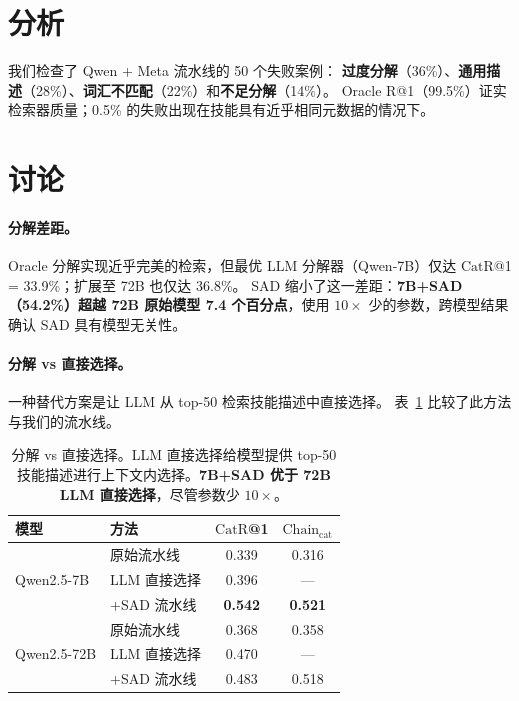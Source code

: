 \documentclass[11pt,a4paper]{ctexart}
\newcommand{\catrecall}{\text{CatR}}
\newcommand{\chaincat}{\text{Chain}_\text{cat}}
\begin{document}
\section{分析}
\label{sec:analysis}

我们检查了 Qwen + Meta 流水线的 50 个失败案例：
\textbf{过度分解}（36\%）、\textbf{通用描述}（28\%）、\textbf{词汇不匹配}（22\%）和\textbf{不足分解}（14\%）。
Oracle R@1（99.5\%）证实检索器质量；0.5\% 的失败出现在技能具有近乎相同元数据的情况下。

\section{讨论}
\label{sec:discussion}

\paragraph{分解差距。}
Oracle 分解实现近乎完美的检索，但最优 LLM 分解器（Qwen-7B）仅达 $\catrecall$@1 = 33.9\%；扩展至 72B 也仅达 36.8\%。
SAD 缩小了这一差距：\textbf{7B+SAD（54.2\%）超越 72B 原始模型 7.4 个百分点}，使用 $10\times$ 少的参数，跨模型结果确认 SAD 具有模型无关性。

\paragraph{分解 vs 直接选择。}
一种替代方案是让 LLM 从 top-50 检索技能描述中直接选择。
表~\ref{tab:llm-direct} 比较了此方法与我们的流水线。

\begin{table}[t]
\centering
\small
\begin{tabular}{llcc}
\toprule
\textbf{模型} & \textbf{方法} & $\catrecall$\textbf{@1} & $\chaincat$ \\
\midrule
\multirow{3}{*}{Qwen2.5-7B} & 原始流水线 & 0.339 & 0.316 \\
 & LLM 直接选择 & 0.396 & --- \\
 & +SAD 流水线 & \textbf{0.542} & \textbf{0.521} \\
\midrule
\multirow{3}{*}{Qwen2.5-72B} & 原始流水线 & 0.368 & 0.358 \\
 & LLM 直接选择 & 0.470 & --- \\
 & +SAD 流水线 & 0.483 & 0.518 \\
\bottomrule
\end{tabular}
\caption{分解 vs 直接选择。LLM 直接选择给模型提供 top-50 技能描述进行上下文内选择。\textbf{7B+SAD 优于 72B LLM 直接选择}，尽管参数少 $10\times$。}
\label{tab:llm-direct}
\end{table}
\end{document}
